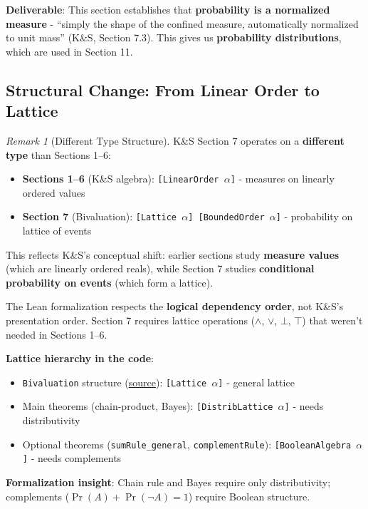 \documentclass[11pt]{article}
\theoremstyle{definition}
\theoremstyle{remark}
\newtheorem{remark}[theorem]{Remark}
\begin{document}
\textbf{Deliverable}: This section establishes that \textbf{probability is a normalized measure} - ``simply the shape of the confined measure, automatically normalized to unit mass'' (K\&S, Section 7.3). This gives us \textbf{probability distributions}, which are used in Section 11.

\subsection{Structural Change: From Linear Order to Lattice}

\begin{remark}[Different Type Structure]
K\&S Section 7 operates on a \textbf{different type} than Sections 1--6:

\begin{itemize}
\item \textbf{Sections 1--6} (K\&S algebra): \texttt{[LinearOrder $\alpha$]} - measures on linearly ordered values
\item \textbf{Section 7} (Bivaluation): \texttt{[Lattice $\alpha$] [BoundedOrder $\alpha$]} - probability on lattice of events
\end{itemize}

This reflects K\&S's conceptual shift: earlier sections study \textbf{measure values} (which are linearly ordered reals), while Section 7 studies \textbf{conditional probability on events} (which form a lattice).

The Lean formalization respects the \textbf{logical dependency order}, not K\&S's presentation order. Section 7 requires lattice operations ($\wedge$, $\vee$, $\bot$, $\top$) that weren't needed in Sections 1--6.

\textbf{Lattice hierarchy in the code}:
\begin{itemize}
\item \texttt{Bivaluation} structure (\href{https://github.com/zariuq/ks-foundations-of-inference/blob/main/KnuthSkilling/Probability/ConditionalProbability/Basic.lean}{source}): \texttt{[Lattice $\alpha$]} - general lattice
\item Main theorems (chain-product, Bayes): \texttt{[DistribLattice $\alpha$]} - needs distributivity
\item Optional theorems (\texttt{sumRule\_general}, \texttt{complementRule}): \texttt{[BooleanAlgebra $\alpha$]} - needs complements
\end{itemize}

\textbf{Formalization insight}: Chain rule and Bayes require only distributivity; complements ($\Pr(A) + \Pr(\neg A) = 1$) require Boolean structure.
\end{remark}
\end{document}
